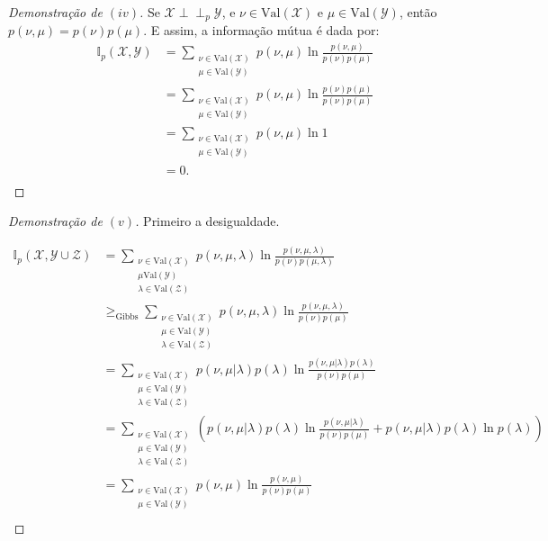 \documentclass[paper=a4, fontsize=11pt]{scrartcl} %
\numberwithin{equation}{subsection}
\numberwithin{figure}{subsection}
\numberwithin{table}{subsection}
\numberwithin{definition}{subsection}
\numberwithin{theorem}{subsection}
\numberwithin{property}{subsection}
\numberwithin{proposition}{subsection}
\numberwithin{equation}{section}
\numberwithin{figure}{section}
\numberwithin{table}{section}
\numberwithin{definition}{section}
\numberwithin{theorem}{section}
\numberwithin{property}{section}
\numberwithin{proposition}{section}
\def\ind{\perp\!\!\!\perp}
\newcommand{\set}[1]{\mathcal{#1}}
\newcommand{\infp}{\ensuremath{\mathbb{I}_p}\xspace}
\newcommand{\val}{\ensuremath{\text{Val}}\xspace}
\newcommand{\Y}{\ensuremath{\set{Y}}\xspace}
\newcommand{\X}{\ensuremath{\set{X}}\xspace}
\newcommand{\Z}{\ensuremath{\set{Z}}\xspace}
\begin{document}
\begin{proof}[Demonstração de $(iv)$]

Se $\X \ind_p \Y$, e $\nu \in \val(\X)$ e $\mu \in \val(\Y)$, então $p(\nu, \mu) = p(\nu)p(\mu)$. E assim,
a informação mútua é dada por:
\begin{align*}
\infp(\set{X}, \set{Y})
  &= \sum_{\substack{\nu \in \val(\set{X}) \\ \mu \in \val(\set{Y})}} p(\nu, \mu) \ln \frac{p(\nu, \mu)}{p(\nu)p(\mu)} \\
  &= \sum_{\substack{\nu \in \val(\set{X}) \\ \mu \in \val(\set{Y})}} p(\nu, \mu) \ln \frac{p(\nu) p(\mu)}{p(\nu)p(\mu)} \\
  &= \sum_{\substack{\nu \in \val(\set{X}) \\ \mu \in \val(\set{Y})}} p(\nu, \mu) \ln 1 \\
  &= 0. \\
\end{align*}

\end{proof}

\begin{proof}[Demonstração de $(v)$]

Primeiro a desigualdade.

\begin{align*}
\infp(\X, \Y \cup \Z)
  &= \sum_{\substack{\nu \in \val(\X) \\ \mu  \val(\Y) \\ \lambda \in \val(\Z)}} 
    p(\nu, \mu, \lambda) \ln \frac{p(\nu, \mu, \lambda)}{p(\nu)p(\mu, \lambda)} \\  
  &\geq_{\text{Gibbs}} \sum_{\substack{\nu \in \val(\X) \\ \mu \in \val(\Y) \\ \lambda \in \val(\Z)}} 
    p(\nu, \mu, \lambda) \ln \frac{p(\nu, \mu, \lambda)}{p(\nu)p(\mu)} \\
  &= \sum_{\substack{\nu \in \val(\X) \\ \mu \in \val(\Y) \\ \lambda \in \val(\Z)}} 
    p(\nu, \mu | \lambda) p(\lambda) \ln \frac{p(\nu, \mu | \lambda) p (\lambda)}{p(\nu)p(\mu)} \\
  &= \sum_{\substack{\nu \in \val(\X) \\ \mu \in \val(\Y) \\ \lambda \in \val(\Z)}} 
    \left( p(\nu, \mu | \lambda) p(\lambda) \ln \frac{p(\nu, \mu | \lambda) }{p(\nu)p(\mu)} + p(\nu, \mu | \lambda) p(\lambda) \ln p (\lambda) \right) \\
  &=\sum_{\substack{\nu \in \val(\X) \\ \mu \in \val(\Y)}} 
    p(\nu, \mu) \ln \frac{p(\nu, \mu)}{p(\nu)p(\mu)} \\  
\end{align*}

\end{proof}
\end{document}
